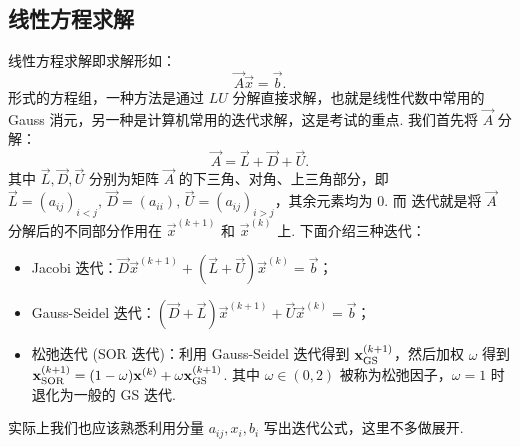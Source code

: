 \subsection*{线性方程求解}
线性方程求解即求解形如：
\[
    \vec{A}\vec{x} = \vec{b}.
\]
形式的方程组，一种方法是通过 $LU$ 分解直接求解，也就是线性代数中常用的 Gauss 消元，另一种是计算机常用的迭代求解，这是考试的重点. 我们首先将 $\vec{A}$ 分解：
\[
    \vec{A} = \vec{L}+\vec{D}+\vec{U}.
\]
其中 $\vec{L},\vec{D},\vec{U}$ 分别为矩阵 $\vec{A}$ 的下三角、对角、上三角部分，即 $\vec{L} = (a_{ij})_{i<j},\,\vec{D} = (a_{ii}),\,\vec{U} = (a_{ij})_{i>j}$，其余元素均为 $0$. 而{\color{red} 迭代就是将 $\vec{A}$ 分解后的不同部分作用在 $\vec{x}^{(k+1)}$ 和 $\vec{x}^{(k)}$ 上}. 下面介绍三种迭代：
\begin{itemize}
    \item Jacobi 迭代：$\vec{D}\vec{x}^{(k+1)}+(\vec{L}+\vec{U})\vec{x}^{(k)} = \vec{b}$；
    \item Gauss-Seidel 迭代：$(\vec{D}+\vec{L})\vec{x}^{(k+1)}+\vec{U}\vec{x}^{(k)} = \vec{b}$；
    \item 松弛迭代 (SOR 迭代)：利用 Gauss-Seidel 迭代得到 $\vec{x}^{(k+1)}_{\rm GS} $，然后加权 $\omega$ 得到 $\vec{x}^{(k+1)}_{\rm SOR} = (1-\omega)\vec{x}^{(k)}+\omega \vec{x}^{(k+1)}_{\rm GS}$. 其中 $\omega \in(0,2)$ 被称为松弛因子，$\omega = 1$ 时退化为一般的 GS 迭代.
\end{itemize}
实际上我们也应该熟悉利用分量 $a_{ij},x_i,b_i$ 写出迭代公式，这里不多做展开.

